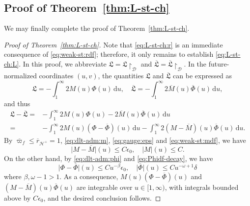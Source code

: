 \documentclass[10pt, reqno]{amsart}
\theoremstyle{definition}
\theoremstyle{remark}
\theoremstyle{conjecture}
\numberwithin{equation}{section}
\newcommand{\abs}[1]{\vert#1\vert}
\newcommand{\ep}{\epsilon}
\newcommand{\ud}{\mathrm{d}}
\newcommand{\0}{\emptyset}
\newcommand{\bt}{\beta}
\newcommand{\dlt}{\delta}
\newcommand{\eps}{\epsilon}
\newcommand{\omg}{\omega}
\newcommand{\calD}{\mathcal D}
\newcommand{\calH}{\mathcal H}
\newcommand{\EH}{\calH^{+}}
\newcommand{\rbg}{\overline{r}}					%
\newcommand{\varpibg}{\overline{\varpi}}				%
\newcommand{\Phibg}{\overline{\Phi}}				%
\begin{document}
\subsection{Proof of Theorem~\ref{thm:L-st-ch}} \label{subsec:main-st-pf} 
We may finally complete the proof of Theorem~\ref{thm:L-st-ch}.
\begin{proof}[Proof of Theorem~\ref{thm:L-st-ch}]
Note that \eqref{eq:L-st-ch:r} is an immediate consequence of \eqref{eq:weak-st:rdf}; therefore, it only remains to establish \eqref{eq:L-st-ch:L}.
In this proof, we abbreviate $\mathfrak{L} = \mathfrak{L} \restriction_{\calD}$ and $\overline{\mathfrak{L}} = \overline{\mathfrak{L}} \restriction_{\calD}$.
In the future-normalized coordinates $(u, v)$, the quantities $\mathfrak{L}$ and $\overline{\mathfrak{L}}$ can be expressed as
\begin{equation*}
	\mathfrak{L} = - \int_{1}^{\infty} 2 M(u) \Phi(u) \, \ud u, \quad
	\overline{\mathfrak{L}} = - \int_{1}^{\infty} 2 \overline{M}(u) \overline{\Phi}(u) \, \ud u,
\end{equation*}
and thus
\begin{align*}
	\mathfrak{L} - \overline{\mathfrak{L}} 
	=& - \int_{1}^{\infty} 2 M(u) \Phi(u) - 2 \overline{M}(u) \Phibg(u) \, \ud u \\
	=& - \int_{1}^{\infty} 2 M(u) (\Phi - \Phibg)(u)  \, \ud u - \int_{1}^{\infty} 2 (M - \overline{M})(u) \Phibg (u)  \, \ud u.
\end{align*}
By $\varpibg_{f} \leq \rbg_{\EH} = 1$, \eqref{eq:dlt-adm:m}, \eqref{eq:gauge:eps} and \eqref{eq:weak-st:mdf}, we have
\begin{equation*}
\abs{M - \overline{M}}(u) \leq C \eps_{0}, \quad \abs{M}(u) \leq C.
\end{equation*}
On the other hand, by \eqref{eq:dlt-adm:phi} and \eqref{eq:Phidf-decay}, we have
\begin{equation*}
\abs{\Phi - \Phibg}(u) \leq C u^{-\bt} \eps_{0}, \quad
\abs{\Phibg}(u) \leq C u^{-\omg + 1} \dlt
\end{equation*}
where $\bt, \omg-1 > 1$. As a consequence, $M(u) (\Phi - \Phibg)(u)$ and $(M - \overline{M})(u) \Phibg (u)$ are integrable over $u \in [1, \infty)$, with integrals bounded above by $C\ep_0$, and the desired conclusion follows. \qedhere
\end{proof}

%
%
%
%
%
\end{document}
